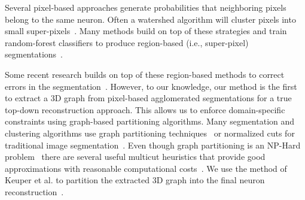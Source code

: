 Several pixel-based approaches generate probabilities that neighboring pixels belong to the same neuron.
Often a watershed algorithm will cluster pixels into small super-pixels~\cite{zlateski2015image}.
Many methods build on top of these strategies and train random-forest classifiers to produce region-based (i.e., super-pixel) segmentations~\cite{seymour2016rhoananet,nunez2014graph,10.1371/journal.pone.0125825,parag2017anisotropic,zlateski2015image}.


Some recent research builds on top of these region-based methods to correct errors in the segmentation~\cite{rolnick2017morphological,error_correction_using_CNN,haehn2017guided}.
However, to our knowledge, our method is the first to extract a 3D graph from pixel-based agglomerated segmentations for a true top-down reconstruction approach. This allows us to enforce domain-specific constraints using graph-based partitioning algorithms. Many segmentation and clustering algorithms use graph partitioning techniques~\cite{andres2012globally} or normalized cuts for traditional image segmentation~\cite{kappes2016higher,shi2000normalized,tatiraju2008image}.
Even though graph partitioning is an NP-Hard problem~\cite{demaine2006correlation} there are several useful multicut heuristics that provide good approximations with reasonable computational costs~\cite{horvnakova2017analysis}. We use the method of Keuper et al. to partition the extracted 3D graph into the final neuron reconstruction~\cite{keuper2015efficient}.
